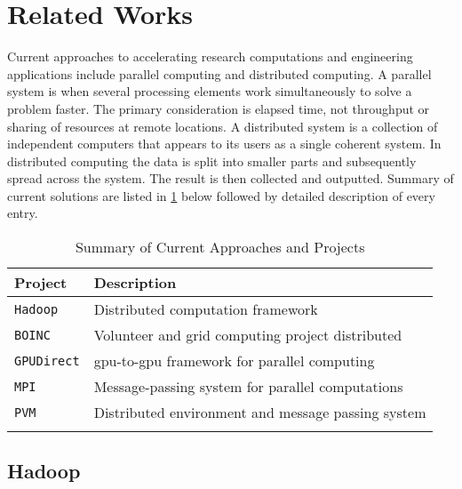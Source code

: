 \section{Related Works}

Current approaches to accelerating research computations and engineering
applications include parallel computing and distributed computing. A parallel
system is when several processing elements work simultaneously to solve a
problem faster. The primary consideration is elapsed time, not throughput or
sharing of resources at remote locations. A distributed system is a collection
of independent computers that appears to its users as a single coherent system.
In distributed computing the data is split into smaller parts and subsequently
spread across the system. The result is then collected and outputted. Summary
of current solutions are listed in \cref{tab:relatedProjects} below followed by
detailed description of every entry.\\

\begin{table}[htb]
\centering
\begin{tabular}{ll}
\toprule{}
\textbf{Project}   & \textbf{Description} \\
\midrule{}
\texttt{Hadoop}    & Distributed computation framework
                     \cite{website:Hadoop-Wiki} \cite{website:Apache-Hadoop}
                     \cite{shvachko2011apache}\\
\midrule{}
\texttt{BOINC}     & Volunteer and grid computing project distributed
                     \cite{anderson2004boinc} \\
\midrule{}
\texttt{GPUDirect} & \gls{gpu}-to-\gls{gpu} framework for parallel computing
                     \cite{website:YouTube} \\
\midrule{}
\texttt{MPI}       & Message-passing system for parallel computations
                     \cite{website:MPI-Tutorial} \cite{website:mpi-4-python} \\
\midrule{}
\texttt{PVM}       & Distributed environment and message passing system
                     \cite{website:Computer-Science-and-Division} \\
\bottomrule{}
\end{tabular}
\caption{Summary of Current Approaches and Projects}
\label{tab:relatedProjects}
\end{table}

\subsection{Hadoop}

